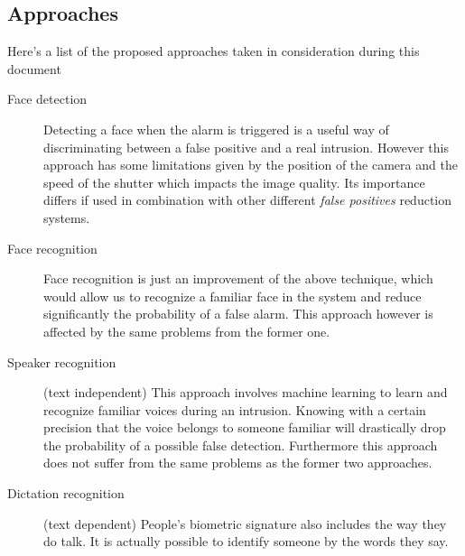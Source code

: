 \subsection{Approaches}
Here's a list of the proposed approaches taken in consideration during this document

\begin{description}
  \item[Face detection] Detecting a face when the alarm is triggered is a useful way of
  discriminating between a false positive and a real intrusion. However this approach has some limitations
  given by the position of the camera and the speed of the shutter which impacts the image quality.
  Its importance differs if used in combination with other different \textit{false positives} reduction
  systems.
  \item[Face recognition] Face recognition is just an improvement of the above technique, which would allow
  us to recognize a familiar face in the system and reduce significantly the probability of a false alarm.
  This approach however is affected by the same problems from the former one.
  \item[Speaker recognition](text independent) This approach involves machine learning to learn and recognize familiar voices
  during an intrusion. Knowing with a certain precision that the voice belongs to someone familiar will
  drastically drop the probability of a possible false detection. Furthermore this approach does not suffer
  from the same problems as the former two approaches.
  \item[Dictation recognition](text dependent) People's biometric signature also includes the way they do talk. It is
  actually possible to identify someone by the words they say.
\end{description}
